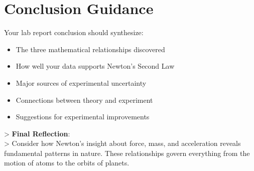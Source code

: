 \documentclass[12pt]{article}
\begin{document}
\section*{Conclusion Guidance}
Your lab report conclusion should synthesize:

\begin{itemize}
\item The three mathematical relationships discovered
\item How well your data supports Newton's Second Law
\item Major sources of experimental uncertainty
\item Connections between theory and experiment
\item Suggestions for experimental improvements
\end{itemize}

> \textbf{Final Reflection}:\\
> Consider how Newton's insight about force, mass, and acceleration reveals fundamental patterns in nature. These relationships govern everything from the motion of atoms to the orbits of planets.
\end{document}
